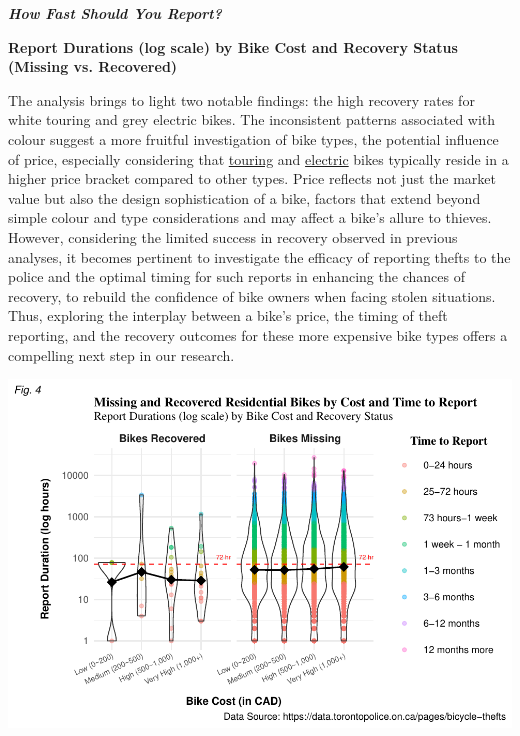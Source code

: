 \documentclass[
  11pt,
]{article}
\begin{document}
\textit{\textbf{{How Fast Should You Report?}}}

\textbf{\footnotesize{
Report Durations (log scale) by Bike Cost and Recovery Status (Missing vs. Recovered)}}

\indent The analysis brings to light two notable findings: the high
recovery rates for white touring and grey electric bikes. The
inconsistent patterns associated with colour suggest a more fruitful
investigation of bike types, the potential influence of price,
especially considering that
\href{https://tomsbiketrip.com/which-touring-bike-should-i-buy/}{touring}
and \href{https://gitnux.org/ebike-statistics/}{electric} bikes
typically reside in a higher price bracket compared to other types.
Price reflects not just the market value but also the design
sophistication of a bike, factors that extend beyond simple colour and
type considerations and may affect a bike's allure to thieves. However,
considering the limited success in recovery observed in previous
analyses, it becomes pertinent to investigate the efficacy of reporting
thefts to the police and the optimal timing for such reports in
enhancing the chances of recovery, to rebuild the confidence of bike
owners when facing stolen situations. Thus, exploring the interplay
between a bike's price, the timing of theft reporting, and the recovery
outcomes for these more expensive bike types offers a compelling next
step in our research.

\begin{center}\includegraphics{Bike_Theft_files/figure-latex/unnamed-chunk-8-1} \end{center}
\end{document}
